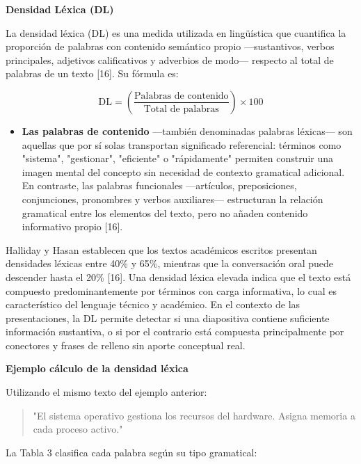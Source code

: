 \documentclass[11pt]{article}
\begin{document}
\textbf{Densidad Léxica (DL)}

La densidad léxica (DL) es una medida utilizada en lingüística que cuantifica la proporción de palabras con contenido semántico propio —sustantivos, verbos principales, adjetivos calificativos y adverbios de modo— respecto al total de palabras de un texto [16]. Su fórmula es:

\[
\mathrm{DL} = \left( \frac{\text{Palabras de contenido}}{\text{Total de palabras}} \right) \times 100
\]

\begin{itemize}
    \item \textbf{Las palabras de contenido } —también denominadas palabras léxicas— son aquellas que por sí solas transportan significado referencial: términos como "sistema", "gestionar", "eficiente" o "rápidamente" permiten construir una imagen mental del concepto sin necesidad de contexto gramatical adicional. En contraste, las palabras funcionales —artículos, preposiciones, conjunciones, pronombres y verbos auxiliares— estructuran la relación gramatical entre los elementos del texto, pero no añaden contenido informativo propio [16].
\end{itemize}

Halliday y Hasan establecen que los textos académicos escritos presentan densidades léxicas entre 40\% y 65\%, mientras que la conversación oral puede descender hasta el 20\% [16]. Una densidad léxica elevada indica que el texto está compuesto predominantemente por términos con carga informativa, lo cual es característico del lenguaje técnico y académico. En el contexto de las presentaciones, la DL permite detectar si una diapositiva contiene suficiente información sustantiva, o si por el contrario está compuesta principalmente por conectores y frases de relleno sin aporte conceptual real.

\textbf{Ejemplo cálculo de la densidad léxica}

Utilizando el mismo texto del ejemplo anterior: 
\begin{quote}
"El sistema operativo gestiona los recursos del hardware. Asigna memoria a cada proceso activo."
\end{quote}
\newpage
La Tabla 3 clasifica cada palabra según su tipo gramatical:
\end{document}
